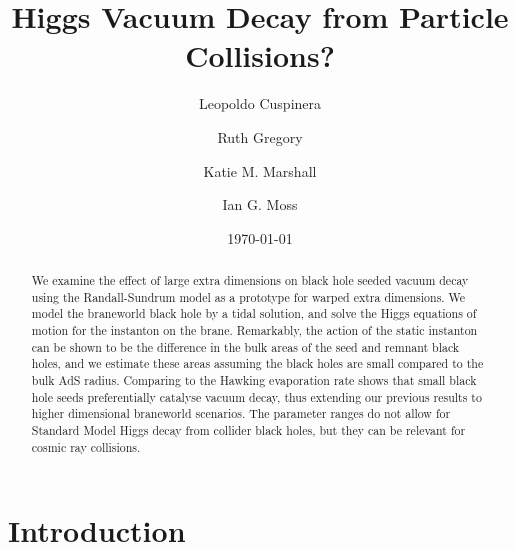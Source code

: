 \documentclass[aps,12pt,prd,superscriptaddress,preprintnumbers, 
	amssymb,
	amsmath,
	notitlepage,
	longbibliography,
	nofootinbib]{revtex4-1}
\begin{document}
\title{Higgs Vacuum Decay from Particle Collisions?}
\date{\today} 


\author{Leopoldo Cuspinera}
\author{Ruth Gregory}
\author{Katie M. Marshall}
\author{Ian G. Moss}

\begin{abstract}
We examine the effect of large extra dimensions on black hole seeded
vacuum decay using the Randall-Sundrum model as a prototype for warped
extra dimensions. We model the braneworld black hole by a tidal solution,
and solve the Higgs equations of motion for the instanton on the brane. 
Remarkably, the action of the static instanton can be shown to be the
difference in the bulk areas of the seed and remnant black holes, and we
estimate these areas assuming the black holes are small compared to the
bulk AdS radius. Comparing to the Hawking evaporation rate shows that 
small black hole seeds preferentially catalyse vacuum decay, thus extending
our previous results to higher dimensional braneworld scenarios. The
parameter ranges do not allow for Standard Model Higgs decay from
collider black holes, but they can be relevant for cosmic ray collisions.
\end{abstract}






\maketitle

\section{Introduction}
\end{document}
